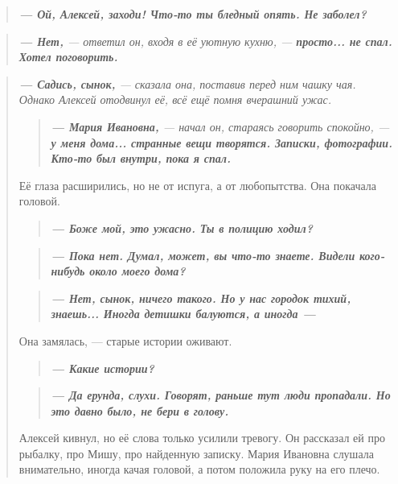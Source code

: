 \documentclass[12pt,a4paper]{book}
\newenvironment{dialogue}{\begin{quote}\itshape}{\end{quote}}
\begin{document}
\begin{dialogue}
\textbf{--- Ой, Алексей, заходи! Что-то ты бледный опять. Не заболел?}
\end{dialogue}

\begin{dialogue}
\textbf{--- Нет,} --- ответил он, входя в её уютную кухню, --- \textbf{просто... не спал. Хотел поговорить.}
\end{dialogue}

\begin{dialogue}
\textbf{--- Садись, сынок,} --- сказала она, поставив перед ним чашку чая. Однако Алексей отодвинул её, всё ещё помня вчерашний ужас.

\begin{dialogue}
\textbf{--- Мария Ивановна,} --- начал он, стараясь говорить спокойно, --- \textbf{у меня дома... странные вещи творятся. Записки, фотографии. Кто-то был внутри, пока я спал.}
\end{dialogue}

Её глаза расширились, но не от испуга, а от любопытства. Она покачала головой.

\begin{dialogue}
\textbf{--- Боже мой, это ужасно. Ты в полицию ходил?}
\end{dialogue}

\begin{dialogue}
\textbf{--- Пока нет. Думал, может, вы что-то знаете. Видели кого-нибудь около моего дома?}
\end{dialogue}

\begin{dialogue}
\textbf{--- Нет, сынок, ничего такого. Но у нас городок тихий, знаешь... Иногда детишки балуются, а иногда ---}
\end{dialogue}

Она замялась, --- старые истории оживают.

\begin{dialogue}
\textbf{--- Какие истории?}
\end{dialogue}

\begin{dialogue}
\textbf{--- Да ерунда, слухи. Говорят, раньше тут люди пропадали. Но это давно было, не бери в голову.}
\end{dialogue}

Алексей кивнул, но её слова только усилили тревогу. Он рассказал ей про рыбалку, про Мишу, про найденную записку. Мария Ивановна слушала внимательно, иногда качая головой, а потом положила руку на его плечо.


\end{dialogue}
\end{document}
